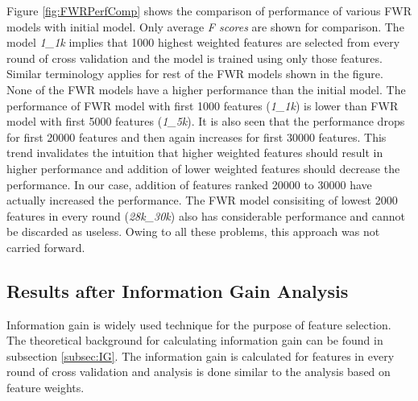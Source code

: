 Figure \ref{fig:FWRPerfComp} shows the comparison of performance of various FWR models with initial model. Only average \textit{F scores} are shown for comparison. The model \textit{1\_1k} implies that 1000 highest weighted features are selected from every round of cross validation and the model is trained using only those features. Similar terminology applies for rest of the FWR models shown in the figure. None of the FWR models have a higher performance than the initial model. The performance of FWR model with first 1000 features (\textit{1\_1k}) is lower than FWR model with first 5000 features (\textit{1\_5k}). It is also seen that the performance drops for first 20000 features and then again increases for first 30000 features. This trend invalidates the intuition that higher weighted features should result in higher performance and addition of lower weighted features should decrease the performance. In our case, addition of features ranked 20000 to 30000 have actually increased the performance. The FWR model consisiting of lowest 2000 features in every round (\textit{28k\_30k}) also has considerable performance and cannot be discarded as useless. Owing to all these problems, this approach was not carried forward.
 
\subsection{Results after Information Gain Analysis}

Information gain is widely used technique for the purpose of feature selection. The theoretical background for calculating information gain can be found in subsection \ref{subsec:IG}. The information gain is calculated for features in every round of cross validation and analysis is done similar to the analysis based on feature weights.

